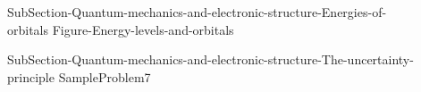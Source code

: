 \documentclass[main.tex]{subfiles}
\begin{document}
\begin{description}
%  
%    
%
%
%

\item[] {SubSection-Quantum-mechanics-and-electronic-structure-Energies-of-orbitals}
{Figure-Energy-levels-and-orbitals}
\item[] 
{SubSection-Quantum-mechanics-and-electronic-structure-The-uncertainty-principle}
  {SampleProblem7}
\end{description}
\end{document}
